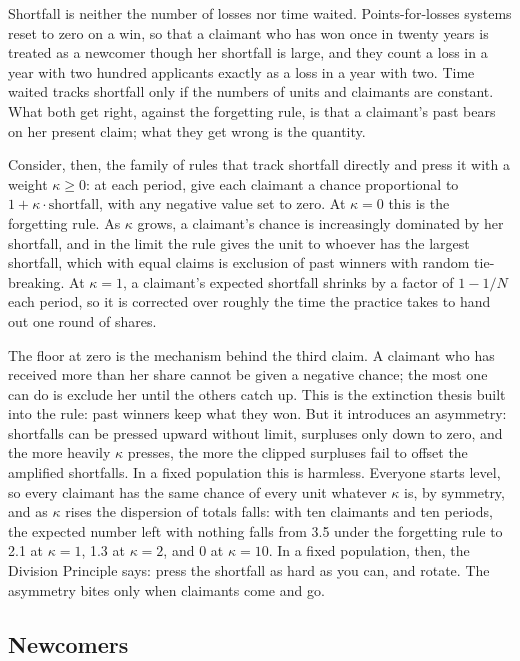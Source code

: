 \documentclass[
  11pt,
  letterpaper,
  DIV=11,
  numbers=noendperiod,
  twoside]{scrartcl}
\begin{document}
Shortfall is neither the number of losses nor time waited.
Points-for-losses systems reset to zero on a win, so that a claimant who
has won once in twenty years is treated as a newcomer though her
shortfall is large, and they count a loss in a year with two hundred
applicants exactly as a loss in a year with two. Time waited tracks
shortfall only if the numbers of units and claimants are constant. What
both get right, against the forgetting rule, is that a claimant's past
bears on her present claim; what they get wrong is the quantity.

Consider, then, the family of rules that track shortfall directly and
press it with a weight \(\kappa \geq 0\): at each period, give each
claimant a chance proportional to \(1 + \kappa \cdot \text{shortfall}\),
with any negative value set to zero. At \(\kappa = 0\) this is the
forgetting rule. As \(\kappa\) grows, a claimant's chance is
increasingly dominated by her shortfall, and in the limit the rule gives
the unit to whoever has the largest shortfall, which with equal claims
is exclusion of past winners with random tie-breaking. At
\(\kappa = 1\), a claimant's expected shortfall shrinks by a factor of
\(1 - 1/N\) each period, so it is corrected over roughly the time the
practice takes to hand out one round of shares.

The floor at zero is the mechanism behind the third claim. A claimant
who has received more than her share cannot be given a negative chance;
the most one can do is exclude her until the others catch up. This is
the extinction thesis built into the rule: past winners keep what they
won. But it introduces an asymmetry: shortfalls can be pressed upward
without limit, surpluses only down to zero, and the more heavily
\(\kappa\) presses, the more the clipped surpluses fail to offset the
amplified shortfalls. In a fixed population this is harmless. Everyone
starts level, so every claimant has the same chance of every unit
whatever \(\kappa\) is, by symmetry, and as \(\kappa\) rises the
dispersion of totals falls: with ten claimants and ten periods, the
expected number left with nothing falls from 3.5 under the forgetting
rule to 2.1 at \(\kappa = 1\), 1.3 at \(\kappa = 2\), and 0 at
\(\kappa = 10\). In a fixed population, then, the Division Principle
says: press the shortfall as hard as you can, and rotate. The asymmetry
bites only when claimants come and go.

\subsection{Newcomers}\label{newcomers}
\end{document}
